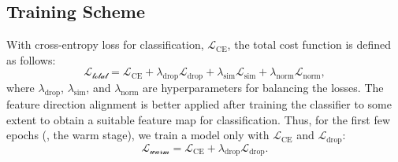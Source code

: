 \subsection{Training Scheme}\label{sec:training_scheme}
With cross-entropy loss for classification, $\mathcal{L}_\text{CE}$, the total cost function is defined as follows:
\begin{equation}\label{eq:loss_tot_step2}
\mathcal{L_\text{total}} = \mathcal{L}_\text{CE} + \lambda_\text{drop} \mathcal{L}_\text{drop} + \lambda_\text{sim} \mathcal{L}_\text{sim} + \lambda_\text{norm} \mathcal{L}_\text{norm},
\end{equation}
where $\lambda_\text{drop}$, $\lambda_\text{sim}$, and $\lambda_\text{norm}$ are hyperparameters for balancing the losses.
The feature direction alignment is better applied after training the classifier to some extent to obtain a suitable feature map for classification.
Thus, for the first few epochs (\ie, the warm stage), we train a model only with $\mathcal{L}_\text{CE}$ and $\mathcal{L}_\text{drop}$:
\vspace{-1pt}
\begin{equation}\label{eq:loss_tot_step1}
\mathcal{L_\text{warm}} = \mathcal{L}_\text{CE} + \lambda_\text{drop} \mathcal{L}_\text{drop}.
\end{equation}